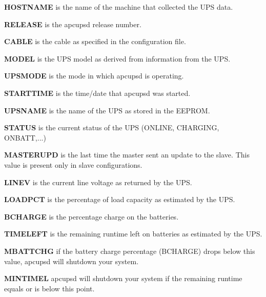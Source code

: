 {{{{{{{{{{{{{{{\begin{description}
\item {\bf HOSTNAME}
is the name of the machine that collected the UPS data.  

\item {\bf RELEASE}
is the apcupsd release number.  

\item {\bf CABLE}
is the cable as specified in the configuration file.  

\item {\bf MODEL}
is the UPS model as derived from information from the UPS.  

\item {\bf UPSMODE}
is the mode in which apcupsd is operating.  

\item {\bf STARTTIME}
is the time/date that apcupsd was started.  

\item {\bf UPSNAME}
is the name of the UPS as stored in the EEPROM.  

\item {\bf STATUS}
is the current status of the UPS (ONLINE, CHARGING, ONBATT,...)  

\item {\bf MASTERUPD}
is the last time the master sent an update to the slave. This value is present
only in slave configurations.  

\item {\bf LINEV}
is the current line voltage as returned by the UPS.  

\item {\bf LOADPCT}
is the percentage of load capacity as estimated by the UPS.  

\item {\bf BCHARGE}
is the percentage charge on the batteries.  

\item {\bf TIMELEFT}
is the remaining runtime left on batteries as estimated by the UPS.  

\item {\bf MBATTCHG}
if the battery charge percentage (BCHARGE) drops below this value, apcupsd
will shutdown your system.  

\item {\bf MINTIMEL}
apcupsd will shutdown your system if the remaining runtime equals or is below
this point.  


\end{description}}}}}}}}}}}}}}}}
